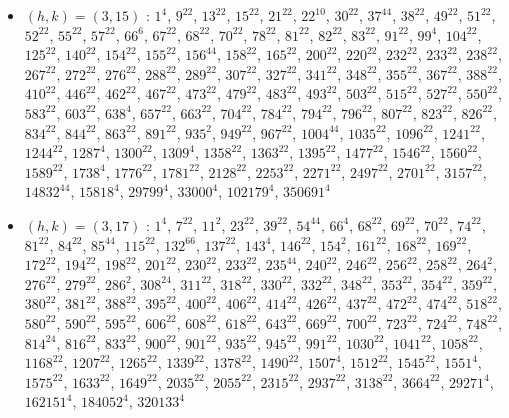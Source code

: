 \begin{itemize}
\item $(h,k)=(3,15)$ : $1^{4}$, $9^{22}$, $13^{22}$, $15^{22}$, $21^{22}$, $22^{10}$, $30^{22}$, $37^{44}$, $38^{22}$, $49^{22}$, $51^{22}$, $52^{22}$, $55^{22}$, $57^{22}$, $66^{6}$, $67^{22}$, $68^{22}$, $70^{22}$, $78^{22}$, $81^{22}$, $82^{22}$, $83^{22}$, $91^{22}$, $99^{4}$, $104^{22}$, $125^{22}$, $140^{22}$, $154^{22}$, $155^{22}$, $156^{44}$, $158^{22}$, $165^{22}$, $200^{22}$, $220^{22}$, $232^{22}$, $233^{22}$, $238^{22}$, $267^{22}$, $272^{22}$, $276^{22}$, $288^{22}$, $289^{22}$, $307^{22}$, $327^{22}$, $341^{22}$, $348^{22}$, $355^{22}$, $367^{22}$, $388^{22}$, $410^{22}$, $446^{22}$, $462^{22}$, $467^{22}$, $473^{22}$, $479^{22}$, $483^{22}$, $493^{22}$, $503^{22}$, $515^{22}$, $527^{22}$, $550^{22}$, $583^{22}$, $603^{22}$, $638^{4}$, $657^{22}$, $663^{22}$, $704^{22}$, $784^{22}$, $794^{22}$, $796^{22}$, $807^{22}$, $823^{22}$, $826^{22}$, $834^{22}$, $844^{22}$, $863^{22}$, $891^{22}$, $935^{2}$, $949^{22}$, $967^{22}$, $1004^{44}$, $1035^{22}$, $1096^{22}$, $1241^{22}$, $1244^{22}$, $1287^{4}$, $1300^{22}$, $1309^{4}$, $1358^{22}$, $1363^{22}$, $1395^{22}$, $1477^{22}$, $1546^{22}$, $1560^{22}$, $1589^{22}$, $1738^{4}$, $1776^{22}$, $1781^{22}$, $2128^{22}$, $2253^{22}$, $2271^{22}$, $2497^{22}$, $2701^{22}$, $3157^{22}$, $14832^{44}$, $15818^{4}$, $29799^{4}$, $33000^{4}$, $102179^{4}$, $350691^{4}$
\item $(h,k)=(3,17)$ : $1^{4}$, $7^{22}$, $11^{2}$, $23^{22}$, $39^{22}$, $54^{44}$, $66^{4}$, $68^{22}$, $69^{22}$, $70^{22}$, $74^{22}$, $81^{22}$, $84^{22}$, $85^{44}$, $115^{22}$, $132^{66}$, $137^{22}$, $143^{4}$, $146^{22}$, $154^{2}$, $161^{22}$, $168^{22}$, $169^{22}$, $172^{22}$, $194^{22}$, $198^{22}$, $201^{22}$, $230^{22}$, $233^{22}$, $235^{44}$, $240^{22}$, $246^{22}$, $256^{22}$, $258^{22}$, $264^{2}$, $276^{22}$, $279^{22}$, $286^{2}$, $308^{24}$, $311^{22}$, $318^{22}$, $330^{22}$, $332^{22}$, $348^{22}$, $353^{22}$, $354^{22}$, $359^{22}$, $380^{22}$, $381^{22}$, $388^{22}$, $395^{22}$, $400^{22}$, $406^{22}$, $414^{22}$, $426^{22}$, $437^{22}$, $472^{22}$, $474^{22}$, $518^{22}$, $580^{22}$, $590^{22}$, $595^{22}$, $606^{22}$, $608^{22}$, $618^{22}$, $643^{22}$, $669^{22}$, $700^{22}$, $723^{22}$, $724^{22}$, $748^{22}$, $814^{24}$, $816^{22}$, $833^{22}$, $900^{22}$, $901^{22}$, $935^{22}$, $945^{22}$, $991^{22}$, $1030^{22}$, $1041^{22}$, $1058^{22}$, $1168^{22}$, $1207^{22}$, $1265^{22}$, $1339^{22}$, $1378^{22}$, $1490^{22}$, $1507^{4}$, $1512^{22}$, $1545^{22}$, $1551^{4}$, $1575^{22}$, $1633^{22}$, $1649^{22}$, $2035^{22}$, $2055^{22}$, $2315^{22}$, $2937^{22}$, $3138^{22}$, $3664^{22}$, $29271^{4}$, $162151^{4}$, $184052^{4}$, $320133^{4}$

\end{itemize}
